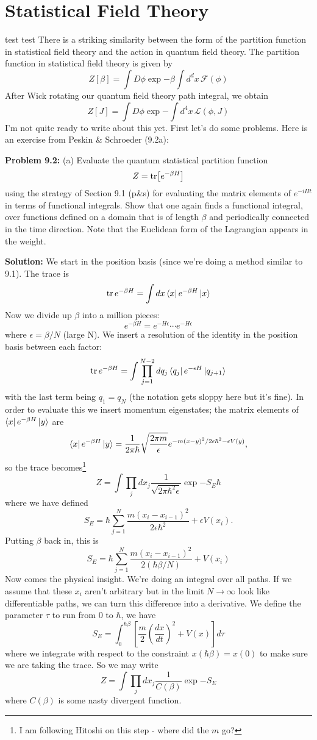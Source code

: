 \documentclass{book}
\begin{document}
\chapter{Statistical Field Theory}
test test
There is a striking similarity between the form of the partition function in statistical field theory and the action in quantum field theory. The partition function in statistical field theory is given by
\[
Z[\beta] = \int D \phi \exp{- \beta \int d^d x \, \mathcal{F} (\phi)}
\]
After Wick rotating our quantum field theory path integral, we obtain
\[
Z[J] = \int D \phi \exp{-  \int d^4 x \, \mathcal{L} (\phi,J)}
\]
I'm not quite ready to write about this yet. First let's do some problems. Here is an exercise from Peskin {\&} Schroeder (9.2a):

\textbf{Problem 9.2:} \newline
(a) Evaluate the quantum statistical partition function
\[
Z = \tr [e^{-\beta H}]
\]
using the strategy of Section 9.1 (p{\&}s) for evaluating the matrix elements of $e^{-iHt}$ in terms of functional integrals. Show that one again finds a functional integral, over functions defined on a domain that is of length $\beta$ and periodically connected in the time direction. Note that the Euclidean form of the Lagrangian appears in the weight. 

\textbf{Solution:} \newline
We start in the position basis (since we're doing a method similar to 9.1). The trace is 
\[
\tr e^{-\beta H} = \int dx \bra{x} e^{-\beta H} \ket{x}
\]
Now we divide up $\beta$ into a million pieces:
\[
e^{-\beta H} = e^{-H\epsilon} \cdots e^{-H\epsilon}
\]
where $\epsilon = \beta/N$ (large N).
We insert a resolution of the identity in the position basis between each factor:
\[
\tr e^{-\beta H} = \int \prod_{j=1}^{N-2} dq_j \bra{q_j} e^{-\epsilon H} \ket{q_{j+1}}
\]
with the last term being $q_1 = q_N$ (the notation gets sloppy here but it's fine). In order to evaluate this we insert momentum eigenstates; the matrix elements of $\bra{x} e^{-\beta H} \ket{y}$ are 
\[
\bra{x} e^{-\beta H} \ket{y} = \frac{1}{2\pi \hbar} \sqrt{\frac{2\pi m}{\epsilon}} e^{-m(x-y)^2/2\epsilon \hbar^2 -\epsilon V(y)},
\]
so the trace becomes\footnote{I am following Hitoshi on this step - where did the $m$ go?}
\[
Z = \int \prod_j dx_j \frac{1}{\sqrt{2\pi \hbar^2 \epsilon}} \exp{-S_E\hbar}
\]
where we have defined
\[
S_E = \hbar \sum_{j=1}^N \frac{m(x_i - x_{i-1})^2}{2\epsilon \hbar^2} + \epsilon V(x_i).
\]
Putting $\beta$ back in, this is
\[
S_E = \hbar \sum_{j=1}^N \frac{m(x_i - x_{i-1})^2}{2(\hbar \beta/N)} + V(x_i)
\]
Now comes the physical insight. We're doing an integral over all paths. If we assume that these $x_i$ aren't arbitrary but in the limit $N\to \infty$ look like differentiable paths, we can turn this difference into a derivative. We define the parameter $\tau$ to run from $0$ to $\hbar$, we have
\[
S_E = \int_0^{\hbar \beta} \left[\frac{m}{2} \left( \frac{dx}{dt} \right)^2 + V(x) \right] d\tau
\]
where we integrate with respect to the constraint $x(\hbar \beta) = x(0)$ to make sure we are taking the trace. So we may write
\[
Z = \int \prod_j dx_j \frac{1}{C(\beta)} \exp{-S_E}
\]
where $C(\beta)$ is some nasty divergent function.
\end{document}

